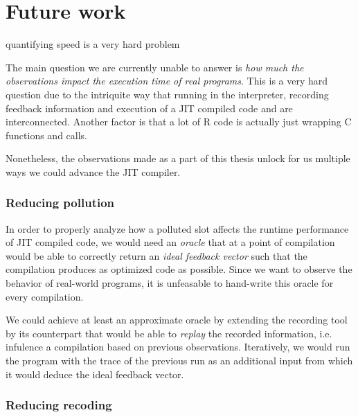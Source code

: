 \section{Future work}


quantifying speed is a very hard problem

The main question we are currently unable to answer is \textit{how much the observations impact the execution time of real programs}. This is a very hard question due to the intriquite way that running in the interpreter, recording feedback information and execution of a JIT compiled code and are interconnected. Another factor is that a lot of R code is actually just wrapping C functions and calls.

Nonetheless, the observations made as a part of this thesis unlock for us multiple ways we could advance the JIT compiler.

\subsubsection*{Reducing pollution}

In order to properly analyze how a polluted slot affects the runtime performance of JIT compiled code, we would need an \textit{oracle} that at a point of compilation would be able to correctly return an \textit{ideal feedback vector} such that the compilation produces as optimized code as possible. Since we want to observe the behavior of real-world programs, it is unfeasable to hand-write this oracle for every compilation.

We could achieve at least an approximate oracle by extending the recording tool by its counterpart that would be able to \textit{replay} the recorded information, i.e. infulence a compilation based on previous observations. Iteratively, we would run the program with the trace of the previous run as an additional input from which it would deduce the ideal feedback vector.

\subsubsection*{Reducing recoding}

